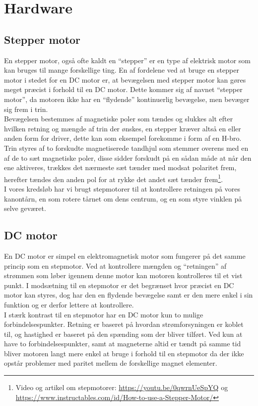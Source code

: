 \section{Hardware}

\subsection{Stepper motor}
En stepper motor, også ofte kaldt en “stepper” er en type af elektrisk motor som kan bruges til mange forskellige ting. En af fordelene ved at bruge en stepper motor i stedet for en DC motor er, at bevægelsen med stepper motor kan gøres meget præcist i forhold til en DC motor. Dette kommer sig af navnet “stepper motor”, da motoren ikke har en “flydende” kontinuerlig bevægelse, men bevæger sig frem i trin.\\

Bevægelsen bestemmes af magnetiske poler som tændes og slukkes alt efter hvilken retning og mængde af trin der ønskes, en stepper kræver altså en eller anden form for driver, dette kan som eksempel forekomme i form af en H-bro. Trin styres af to forskudte magnetiserede tandhjul som stemmer overens med en af de to sæt magnetiske poler, disse sidder forskudt på en sådan måde at når den ene aktiveres, trækkes det nærmeste sæt tænder med modsat polaritet frem, herefter tændes den anden pol for at rykke det andet sæt tænder frem\footnote{Video og artikel om stepmotorer: \url{https://youtu.be/0qwrnUeSpYQ} og \url{https://www.instructables.com/id/How-to-use-a-Stepper-Motor/} 
}. \\

I vores kredsløb har vi brugt stepmotorer til at kontrollere retningen på vores kanontårn, en som rotere tårnet om dens centrum, og en som styre vinklen på selve geværet. 

\subsection{DC motor}
En DC motor er simpel en elektromagnetisk motor som fungerer på det samme princip som en stepmotor. Ved at kontrollere mængden og “retningen” af strømmen som løber igennem denne motor kan motoren kontrolleres til et vist punkt. I modsætning til en stepmotor er det begrænset hvor præcist en DC motor kan styres, dog har den en flydende bevægelse samt er den mere enkel i sin funktion og er derfor lettere at kontrollere.\\

I stærk kontrast til en stepmotor har en DC motor kun to mulige forbindelsespunkter. Retning er baseret på hvordan strømforsyningen er koblet til, og hastighed er baseret på den spænding som der bliver tilført. Ved kun at have to forbindelsespunkter, samt at magneterne altid er tændt på samme tid bliver motoren langt mere enkel at bruge i forhold til en stepmotor da der ikke opstår problemer med paritet mellem de forskellige magnet elementer.



